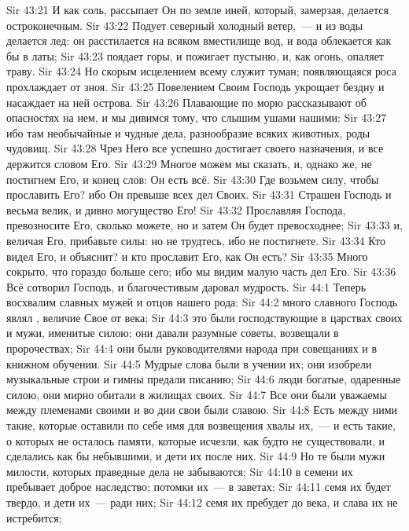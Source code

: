 \vs Sir 43:21 И как соль, рассыпает Он по земле иней, который, замерзая, делается остроконечным.
\vs Sir 43:22 Подует северный холодный ветер,~--- и из воды делается лед: он расстилается на всяком вместилище вод, и вода облекается как бы в латы;
\vs Sir 43:23 поядает горы, и пожигает пустыню, и, как огонь, опаляет траву.
\vs Sir 43:24 Но скорым исцелением всему служит туман; появляющаяся роса прохлаждает от зноя.
\vs Sir 43:25 Повелением Своим Господь укрощает бездну и насаждает на ней острова.
\vs Sir 43:26 Плавающие по морю рассказывают об опасностях на нем, и мы дивимся тому, что слышим ушами нашими:
\vs Sir 43:27 ибо там необычайные и чудные дела, разнообразие всяких животных, роды чудовищ.
\vs Sir 43:28 Чрез Него все успешно достигает своего назначения, и все держится словом Его.
\vs Sir 43:29 Многое можем мы сказать, и, однако же, не постигнем Его, и конец слов: Он есть всё.
\vs Sir 43:30 Где возьмем силу, чтобы прославить Его? ибо Он превыше всех дел Своих.
\vs Sir 43:31 Страшен Господь и весьма велик, и дивно могущество Его!
\vs Sir 43:32 Прославляя Господа, превозносите Его, сколько можете, но и затем Он будет превосходнее;
\vs Sir 43:33 и, величая Его, прибавьте силы: но не трудтесь, ибо не постигнете.
\vs Sir 43:34 Кто видел Его, и объяснит? и кто прославит Его, как Он есть?
\vs Sir 43:35 Много сокрыто, что гораздо больше сего; ибо мы видим малую часть дел Его.
\vs Sir 43:36 Всё сотворил Господь, и благочестивым даровал мудрость.
\vs Sir 44:1 Теперь восхвалим славных мужей и отцов нашего рода:
\vs Sir 44:2 много славного Господь являл , величие Свое от века;
\vs Sir 44:3 это были господствующие в царствах своих и мужи, именитые силою; они давали разумные советы, возвещали в пророчествах;
\vs Sir 44:4 они были руководителями народа при совещаниях и в книжном обучении.
\vs Sir 44:5 Мудрые слова были в учении их; они изобрели музыкальные строи и гимны предали писанию;
\vs Sir 44:6 люди богатые, одаренные силою, они мирно обитали в жилищах своих.
\vs Sir 44:7 Все они были уважаемы между племенами своими и во дни свои были славою.
\vs Sir 44:8 Есть между ними такие, которые оставили по себе имя для возвещения хвалы их,~--- и есть такие, о которых не осталось памяти, которые исчезли, как будто не существовали, и сделались как бы небывшими, и дети их после них.
\vs Sir 44:9 Но те были мужи милости, которых праведные дела не забываются;
\vs Sir 44:10 в семени их пребывает доброе наследство; потомки их~--- в заветах;
\vs Sir 44:11 семя их будет твердо, и дети их~--- ради них;
\vs Sir 44:12 семя их пребудет до века, и слава их не истребится;
